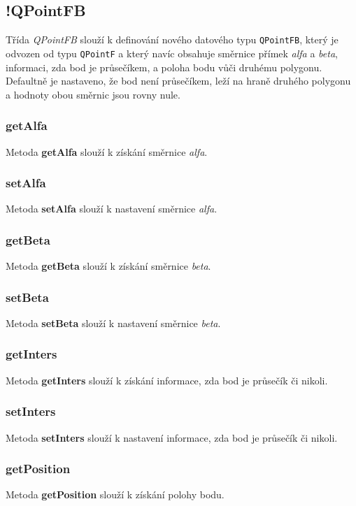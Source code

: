 \documentclass[a4paper, 12pt]{article}
\begin{document}
\subsection{!QPointFB}
Třída \textit{QPointFB} slouží k definování nového datového typu \texttt{QPointFB}, který je odvozen od typu \texttt{QPointF} a který navíc obsahuje směrnice přímek \textsl{alfa} a \textsl{beta}, informaci, zda bod je průsečíkem, a poloha bodu vůči druhému polygonu. Defaultně je nastaveno, že bod není průsečíkem, leží na hraně druhého polygonu a hodnoty obou směrnic jsou rovny nule.

\subsubsection*{getAlfa}
Metoda \textbf{getAlfa} slouží k získání směrnice \textsl{alfa}.

\subsubsection*{setAlfa}
Metoda \textbf{setAlfa} slouží k nastavení směrnice \textsl{alfa}. 

\subsubsection*{getBeta}
Metoda \textbf{getBeta} slouží k získání směrnice \textsl{beta}.

\subsubsection*{setBeta}
Metoda \textbf{setBeta} slouží k nastavení směrnice \textsl{beta}. 

\subsubsection*{getInters}
Metoda \textbf{getInters} slouží k získání informace, zda bod je průsečík či nikoli.

\subsubsection*{setInters}
Metoda \textbf{setInters} slouží k nastavení informace, zda bod je průsečík či nikoli. 

\subsubsection*{getPosition}
Metoda \textbf{getPosition} slouží k získání polohy bodu.
\end{document}
